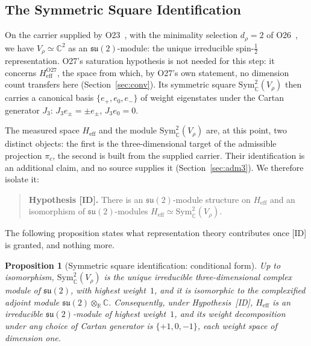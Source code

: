 \documentclass[11pt,a4paper]{article}
\newtheorem{proposition}[theorem]{Proposition}
\newcommand{\Heff}{H_{\mathrm{eff}}}
\newcommand{\su}{\mathfrak{su}}
\newcommand{\Vr}{V_\rho}
\newcommand{\Sym}{\mathrm{Sym}}
\begin{document}
  \subsection{The Symmetric Square Identification}
    \label{sec:sym2}

    On the carrier supplied by O23~\cite{Beau2026a27}, with the minimality selection
    $d_\rho = 2$ of O26~\cite{Beau2026a30}, we have $\Vr \simeq \mathbb{C}^2$ as an
    $\su(2)$-module: the unique irreducible spin-$\tfrac{1}{2}$ representation.
    O27's saturation hypothesis is not needed for this step: it concerns
    $H_{\mathrm{eff}}^{\text{O27}}$, the space from which, by O27's own statement, no dimension
    count transfers here (Section~\ref{sec:conv}).
    Its symmetric square $\Sym^2_\mathbb{C}(\Vr)$ then carries a canonical basis
    $\{e_+, e_0, e_-\}$ of weight eigenstates under the Cartan generator $J_3$:
    $J_3 e_{\pm} = \pm e_{\pm}$, $J_3 e_0 = 0$.

    The measured space $\Heff$ and the module $\Sym^2_\mathbb{C}(\Vr)$ are, at this point, two
    distinct objects: the first is the three-dimensional target of the admissible projection
    $\pi_c$, the second is built from the supplied carrier.
    Their identification is an additional claim, and no source supplies it
    (Section~\ref{sec:adm3}).
    We therefore isolate it:

    \begin{quote}
      \textbf{Hypothesis [ID].} There is an $\su(2)$-module structure on $\Heff$ and an
      isomorphism of $\su(2)$-modules $\Heff \simeq \Sym^2_\mathbb{C}(\Vr)$.
    \end{quote}

    \noindent
    The following proposition states what representation theory contributes once [ID] is granted,
    and nothing more.

    \begin{proposition}[Symmetric square identification: conditional form]
      \label{prop:sym2}
      Up to isomorphism, $\Sym^2_\mathbb{C}(\Vr)$ is the unique irreducible three-dimensional
      complex module of $\su(2)$, with highest weight~$1$, and it is isomorphic to the
      complexified adjoint module $\su(2) \otimes_\mathbb{R} \mathbb{C}$.
      Consequently, under Hypothesis~[ID], $\Heff$ is an irreducible $\su(2)$-module of highest
      weight~$1$, and its weight decomposition under any choice of Cartan generator is
      $\{+1, 0, -1\}$, each weight space of dimension one.
    \end{proposition}
\end{document}
